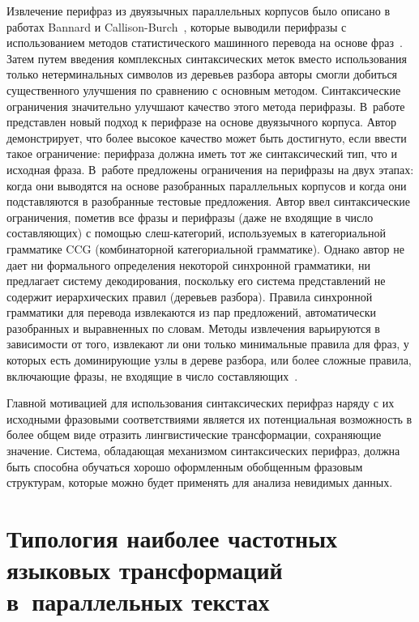 \begin{multicols}{2}
   Извлечение перифраз из двуязычных параллельных корпусов было описано в
работах Bannard и Callison-Burch~\cite{18-koz}, которые выводили перифразы с
использованием методов статистического машинного перевода на основе
фраз~\cite{19-koz}. Затем путем введения комплексных синтаксических меток
вместо использования только нетерминальных символов из деревьев разбора
авторы смогли добиться существенного улучшения по сравнению с основным
методом. Синтаксические ограничения значительно улучшают качество этого
метода перифразы. В~работе~\cite{20-koz} представлен новый подход к
перифразе на основе двуязычного корпуса. Автор демонстрирует, что более
высокое качество может быть достигнуто, если ввести такое ограничение:
перифраза должна иметь тот же синтаксический тип, что и исходная фраза.
В~работе предложены ограничения на перифразы на двух этапах: когда они
выводятся на основе разобранных параллельных корпусов и когда они
подставляются в разобранные тестовые предложения. Автор ввел синтаксические
ограничения, пометив все фразы и перифразы (даже не входящие в число
составляющих) с помощью слеш-ка\-те\-го\-рий, используемых в категориальной
грамматике CCG (комбинаторной категориальной грамматике). Однако автор не
дает ни формального определения некоторой синхронной грамматики, ни
предлагает систему декодирования, поскольку его система представлений не
содержит иерархических правил (деревьев разбора). Правила синхронной
грамматики для перевода извлекаются из пар предложений, автоматически
разобранных и выравненных по словам. Методы извлечения варь\-и\-ру\-ют\-ся в
зависимости от того, извлекают ли они только минимальные правила для фраз, у
которых есть доминирующие узлы в дереве разбора, или более сложные правила,
включающие фразы, не входящие в число составляющих~\cite{21-koz}.

   Главной мотивацией для использования синтаксических перифраз наряду с их
исходными фразовыми соответствиями является их потенциальная возможность в
более общем виде отразить лингвистические трансформации, сохраняющие
значение. Система, обладающая механизмом синтаксических перифраз, должна
быть способна обучаться хорошо оформленным обобщенным фразовым
структурам, которые можно будет применять для анализа невидимых данных.

    \section{Типология наиболее частотных языковых трансформаций
в~параллельных текстах}


\end{multicols}
